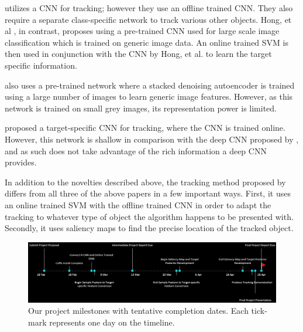 \documentclass{sig-alternate-05-2015}
\begin{document}
\cite{fan2010human} utilizes a CNN for tracking; however they use an offline trained CNN. They also require a separate class-specific network to track various other objects. Hong, et al \cite{hong2015online}, in contrast, proposes using a pre-trained CNN used for large scale image classification which is trained on generic image data. An online trained SVM is then used in conjunction with the CNN by Hong, et al. to learn the target specific information.

\cite{NIPS2013_5192} also uses a pre-trained network where a stacked denoising autoencoder is trained using a large number of images to learn generic image features. However, as this network is trained on small grey images, its representation power is limited.

\cite{7362006} proposed a target-specific CNN for tracking, where the CNN is trained online. However, this network is shallow in comparison with the deep CNN proposed by \cite{hong2015online}, and as such does not take advantage of the rich information a deep CNN provides.

In addition to the novelties described above, the tracking method proposed by \cite{hong2015online} differs from all three of the above papers in a few important ways.
First, it uses an online trained SVM with the offline trained CNN in order to adapt the tracking to whatever type of object the algorithm happens to be presented with.
Secondly, it uses saliency maps to find the precise location of the tracked object.

\begin{figure}[t]
\centering
\includegraphics[width=\textwidth]{ProposedTimeline}
\caption{Our project milestones with tentative completion dates. Each tick-mark represents one day on the timeline.}
\label{fig:milestones}
\end{figure}
\end{document}
